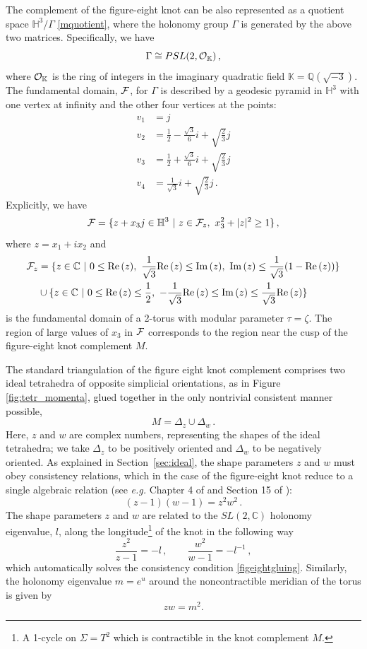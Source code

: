 \documentclass[hyper]{JHEP3}
\renewcommand{\Im}{{\rm Im}\,}
\renewcommand{\Re}{{\rm Re}\,}
\def\CF {{\cal F}}
\def\CO {{\cal O}}
\newcommand{\C}{{\mathbb{C}}}
\newcommand{\IH}{{\mathbb{H}}}
\newcommand\be{\begin{equation}}
\newcommand\ee{\end{equation}}
\begin{document}
The complement of the figure-eight knot can be also represented
as a quotient space $\IH^3/\Gamma$ \eqref{mquotient}, where the holonomy group $\Gamma$
is generated by the above two matrices. Specifically, we have
\be
\Gamma \cong PSL (2, \CO_{\mathbb{K}})\,,
\ee
where $\CO_{\mathbb{K}}$ is the ring of integers in the imaginary
quadratic field $\mathbb{K} = \mathbb{Q} (\sqrt{-3})$.
%
The fundamental domain, $\CF$, for $\Gamma$ is described by
a geodesic pyramid in $\IH^3$ with one vertex at infinity
and the other four vertices at the points:
\begin{align}
v_1 & = j \nonumber \\
v_2 & = \frac{1}{2} - \frac{\sqrt{3}}{6} i + \sqrt{\frac{2}{3}} j \\
v_3 & = \frac{1}{2} + \frac{\sqrt{3}}{6} i + \sqrt{\frac{2}{3}} j \nonumber \\
v_4 & = \frac{1}{\sqrt{3}} i + \sqrt{\frac{2}{3}} j\,. \nonumber
\end{align}
Explicitly, we have
\be
\CF = \{ z + x_3 j \in \IH^3 ~\vert~ z \in \CF_z, ~x_3^2 + |z|^2 \ge 1 \}\,,
\ee
where $z = x_1 + i x_2$ and
\begin{align}
\CF_z & = \{ z \in \C ~\vert~ 0 \le \Re (z),~
\frac{1}{\sqrt{3}} \Re (z) \le \Im (z),~
\Im (z) \le \frac{1}{\sqrt{3}} (1 - \Re (z)) \} \nonumber \\
& \cup \{ z \in \C ~\vert~ 0 \le \Re (z) \le \frac{1}{2},~
- \frac{1}{\sqrt{3}} \Re (z) \le \Im (z) \le \frac{1}{\sqrt{3}} \Re (z) \}
\end{align}
is the fundamental domain of a 2-torus with modular parameter $\tau = \zeta$.
The region of large values of $x_3$ in $\CF$ corresponds to the region near
the cusp of the figure-eight knot complement $M$.

The standard triangulation of the figure eight knot complement
comprises two ideal tetrahedra of opposite simplicial orientations, as in Figure \ref{fig:tetr_momenta},
glued together in the only nontrivial consistent manner possible,
\be
M = \Delta_z \cup \Delta_w\,.
\label{figeighttriang}
\ee
Here, $z$ and $w$ are complex numbers, representing the shapes of the ideal tetrahedra; we take $\Delta_z$ to be positively oriented and $\Delta_w$ to be negatively oriented.
As explained in Section~\ref{sec:ideal},
the shape parameters $z$ and $w$ must obey consistency relations,
which in the case of the figure-eight knot reduce
to a single algebraic relation (see {\it e.g.} Chapter 4 of \cite{thurston-1980} and Section 15 of \cite{neumann-2004}):
\be
(z-1)(w-1)=z^2w^2 \,.
\label{figeightgluing}
\ee
The shape parameters $z$ and $w$ are related to the $SL(2,\C)$ holonomy eigenvalue, $l$,
along the longitude\footnote{A 1-cycle on $\Sigma = T^2$ which is contractible
in the knot complement $M$.} of the knot in the following way
\be
\frac{z^2}{z-1} = -l\,, \qquad \frac{w^2}{w-1} = - l^{-1}\,,
\label{lholviashape}
\ee
which automatically solves the consistency condition \eqref{figeightgluing}.
Similarly, the holonomy eigenvalue $m=e^u$ around the noncontractible meridian of the torus is given by
%
\be z w =m^2. \label{mholviashape} \ee
%
\end{document}
